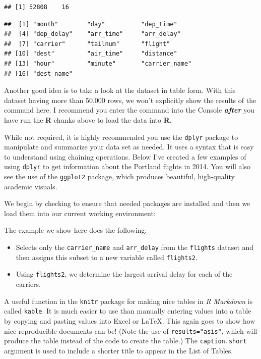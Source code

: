 \documentclass[print]{nuthesis}
\begin{document}
\begin{verbatim}
## [1] 52808    16
\end{verbatim}

\begin{verbatim}
##  [1] "month"        "day"          "dep_time"    
##  [4] "dep_delay"    "arr_time"     "arr_delay"   
##  [7] "carrier"      "tailnum"      "flight"      
## [10] "dest"         "air_time"     "distance"    
## [13] "hour"         "minute"       "carrier_name"
## [16] "dest_name"
\end{verbatim}

Another good idea is to take a look at the dataset in table form. With this dataset having more than 50,000 rows, we won't explicitly show the results of the command here. I recommend you enter the command into the Console \textbf{\emph{after}} you have run the \textbf{R} chunks above to load the data into \textbf{R}.

While not required, it is highly recommended you use the \texttt{dplyr} package to manipulate and summarize your data set as needed. It uses a syntax that is easy to understand using chaining operations. Below I've created a few examples of using \texttt{dplyr} to get information about the Portland flights in 2014. You will also see the use of the \texttt{ggplot2} package, which produces beautiful, high-quality academic visuals.

We begin by checking to ensure that needed packages are installed and then we load them into our current working environment:

\clearpage

The example we show here does the following:

\begin{itemize}
\item
  Selects only the \texttt{carrier\_name} and \texttt{arr\_delay} from the \texttt{flights} dataset and then assigns this subset to a new variable called \texttt{flights2}.
\item
  Using \texttt{flights2}, we determine the largest arrival delay for each of the carriers.
\end{itemize}

A useful function in the \texttt{knitr} package for making nice tables in \emph{R Markdown} is called \texttt{kable}. It is much easier to use than manually entering values into a table by copying and pasting values into Excel or LaTeX. This again goes to show how nice reproducible documents can be! (Note the use of \texttt{results="asis"}, which will produce the table instead of the code to create the table.) The \texttt{caption.short} argument is used to include a shorter title to appear in the List of Tables.
\end{document}
